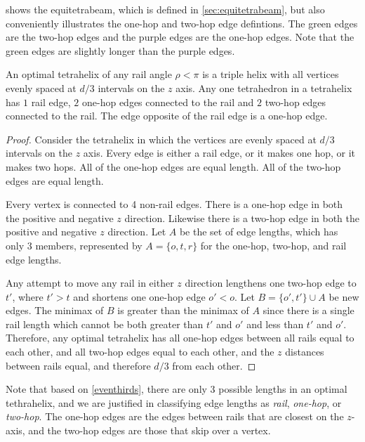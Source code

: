 \documentclass[review]{siamonline1116}
\begin{document}
 shows the equitetrabeam, which is defined in \cref{sec:equitetrabeam},
but also conveniently illustrates the one-hop and two-hop edge defintions.
The green edges are the two-hop edges and the purple edges are the one-hop edges. Note that the green
edges are slightly longer than the purple edges.


\begin{theorem}
  \label{eventhirds}
  An optimal tetrahelix of any rail angle $\rho < \pi$ is a triple helix with all vertices evenly spaced at $d/3$ intervals on the $z$ axis.
  Any one tetrahedron in a tetrahelix has $1$ rail edge, $2$ one-hop edges connected to the rail and $2$ two-hop edges connected to the rail.
  The edge opposite of the rail edge is a one-hop edge.
\end{theorem}

\begin{proof}
    Consider the tetrahelix in which the vertices are evenly spaced at
    $d/3$ intervals on the $z$ axis. Every edge is either a rail edge,
    or it makes one hop, or it makes two hops. All of the one-hop
    edges are equal length.  All of the two-hop edges are equal
    length.

    Every vertex is connected to 4 non-rail edges. There is a one-hop edge
    in both the positive and negative $z$ direction. Likewise there is a two-hop
    edge in both the positive and negative $z$ direction. Let $A$ be the set
    of edge lengths, which has only 3 members, represented by $A = \{o,t,r\}$ for
    the one-hop, two-hop, and rail edge lengths.

    Any attempt to move any rail in either $z$ direction lengthens one two-hop edge to $t'$, where $t' > t$
    and shortens one one-hop edge $o' < o$. Let $B = \{o',t' \} \cup A$ be new edges.
    The minimax of $B$ is greater than the minimax of $A$ since there is a single rail length which cannot be both greater
    than $t'$ and $o'$ and less than $t'$ and $o'$.
    Therefore, any optimal tetrahelix has all one-hop edges between all rails equal to each other, and
    all two-hop edges equal to each other, and the $z$ distances between rails equal, and therefore
    $d/3$ from each other.
\end{proof}

 Note that based on \cref{eventhirds}, there are only 3 possible lengths in an optimal tethrahelix,
 and we are justified in classifying edge lengths as \emph{rail}, \emph{one-hop}, or
\emph{two-hop}. The one-hop edges are the edges between rails that are closest on the $z$-axis, and the two-hop edges are those that skip over a vertex.
\end{document}
